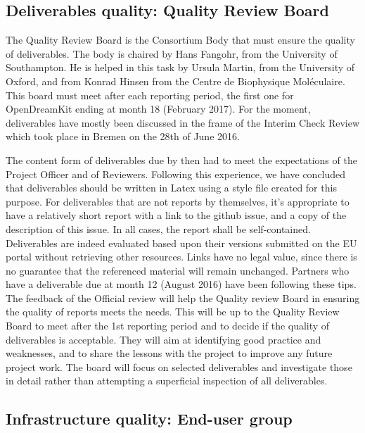 \documentclass{../../Proposal/LaTeX-proposal/deliverablereport}
\begin{document}
\subsection{Deliverables quality: Quality Review Board}

The Quality Review Board is the Consortium Body that must ensure the quality of deliverables.
The body is chaired by Hans Fangohr, from the University of Southampton. He is helped in this task by Ursula Martin, from the University of Oxford, and from Konrad Hinsen from the Centre de Biophysique Moléculaire. This board must meet after each reporting period, the first one for OpenDreamKit ending at month 18 (February 2017). 
For the moment, deliverables have mostly been discussed in the frame of the Interim Check Review which took place in Bremen on the 28th of June 2016.

The content form of deliverables due by then had to meet the expectations of the Project Officer and of Reviewers. Following this experience, we have concluded that deliverables should be written in Latex using a style file created for this purpose. For deliverables that are not reports by themselves, it's appropriate to have a relatively short report with a link to the github issue, and a copy of the description of this issue. In all cases, the report shall be self-contained. Deliverables are indeed evaluated based upon their versions submitted on the EU portal without retrieving other resources. Links have no legal value, since there is no guarantee that the referenced material will remain unchanged.
Partners who have a deliverable due at month 12 (August 2016) have been following these tips. The feedback of the Official review will help the Quality review Board in ensuring the quality of reports meets the needs. This will be up to the Quality Review Board to meet after the 1st reporting period and to decide if the quality of deliverables is acceptable.
They will aim at identifying good practice and weaknesses, and to share the lessons with the project to improve any future project work. The board will focus on selected deliverables and investigate those in detail rather than attempting a superficial inspection of all deliverables.


\subsection{Infrastructure quality: End-user group}
\end{document}
